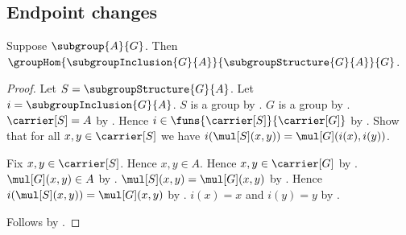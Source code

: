 \subsection{Endpoint changes}

\begin{theorem}\label{subgroup_inclusion_group_hom}
    Suppose $\subgroup{A}{G}$.
    Then
        $\groupHom
            {\subgroupInclusion{G}{A}}
            {\subgroupStructure{G}{A}}
            {G}$.
\end{theorem}
\begin{proof}
    Let $S=\subgroupStructure{G}{A}$.
    Let $i=\subgroupInclusion{G}{A}$.
    $S$ is a group by .
    $G$ is a group by .
    $\carrier[S]=A$ by .
    Hence $i\in\funs{\carrier[S]}{\carrier[G]}$ by
        .
    Show that for all $x,y\in\carrier[S]$ we have
        $i(\mul[S](x,y))=\mul[G](i(x),i(y))$.
    \begin{subproof}
        Fix $x,y\in\carrier[S]$.
        Hence $x,y\in A$.
        Hence $x,y\in\carrier[G]$ by
            .
        $\mul[G](x,y)\in A$ by .
        $\mul[S](x,y)=\mul[G](x,y)$ by
            .
        Hence $i(\mul[S](x,y))=\mul[G](x,y)$ by
            .
        $i(x)=x$ and $i(y)=y$ by
            .
    \end{subproof}
    Follows by .
\end{proof}


